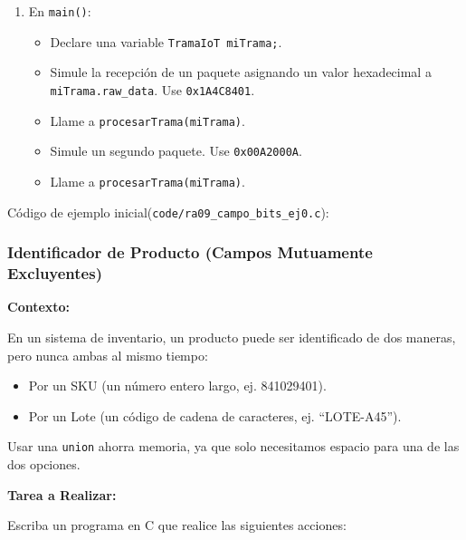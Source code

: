 \begin{enumerate}
    \item En \texttt{main()}:
    \begin{itemize}
        \item Declare una variable \texttt{TramaIoT miTrama;}.
        \item Simule la recepción de un paquete asignando un valor hexadecimal a \texttt{miTrama.raw\_data}. Use \texttt{0x1A4C8401}.
        \item Llame a \texttt{procesarTrama(miTrama)}.
        \item Simule un segundo paquete. Use \texttt{0x00A2000A}.
        \item Llame a \texttt{procesarTrama(miTrama)}.
    \end{itemize}
\end{enumerate}

Código de ejemplo inicial(\texttt{code/ra09\_campo\_bits\_ej0.c}):


\subsubsection{Identificador de Producto (Campos Mutuamente Excluyentes)}

\textbf{Contexto:}

En un sistema de inventario, un producto puede ser identificado de dos maneras, pero nunca ambas al mismo tiempo:

\begin{itemize}
    \item Por un SKU (un número entero largo, ej. 841029401).
    \item Por un Lote (un código de cadena de caracteres, ej. ``LOTE-A45'').
\end{itemize}

Usar una \texttt{union} ahorra memoria, ya que solo necesitamos espacio para una de las dos opciones.



\textbf{Tarea a Realizar:}

Escriba un programa en C que realice las siguientes acciones:


